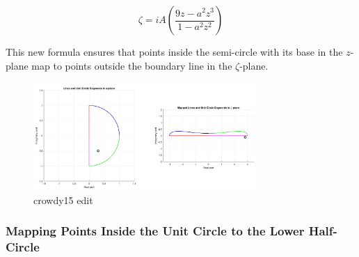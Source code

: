 \[
\zeta = i A \left( \frac{9z - a^2z^3}{1 - a^2z^2} \right)
\]


This new formula ensures that points inside the semi-circle with its base in the \( z \)-plane map to points outside the boundary line in the \(\zeta\)-plane.

\begin{figure}[h]
\centering
\includegraphics[width=0.75\textwidth]{Figs/crowdy2015_edit.png}
\caption{crowdy15 edit}
\label{fig:example}
\end{figure}

\subsubsection{Mapping Points Inside the Unit Circle to the Lower Half-Circle}




